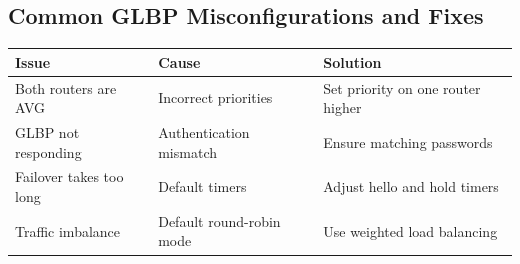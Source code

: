 \documentclass[a4paper]{book}
\begin{document}
\subsection{Common GLBP Misconfigurations and Fixes}
\begin{center}
\begin{tabular}{|p{3.5cm}|p{3.5cm}|p{5cm}|}
\hline
\textbf{Issue} & \textbf{Cause} & \textbf{Solution} \\
\hline
Both routers are AVG & Incorrect priorities & Set priority on one router higher \\
\hline
GLBP not responding & Authentication mismatch & Ensure matching passwords \\
\hline
Failover takes too long & Default timers & Adjust hello and hold timers \\
\hline
Traffic imbalance & Default round-robin mode & Use weighted load balancing \\
\hline
\end{tabular}
\end{center}
\end{document}

